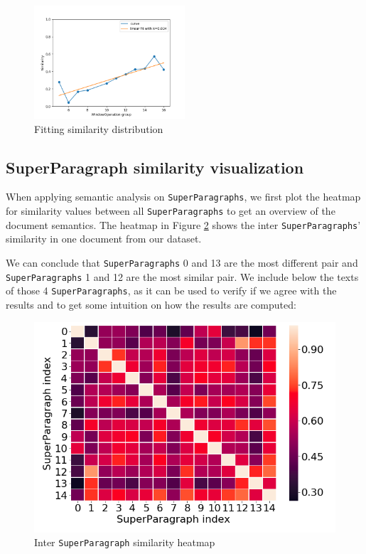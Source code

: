 \begin{figure}[htp]
    \centering
    \includegraphics[width=0.5\textwidth]{figures/linear_fiting.png}
    \caption{Fitting similarity distribution}
    \label{fitting}
\end{figure}



\subsection{SuperParagraph similarity visualization}
When applying semantic analysis on \texttt{SuperParagraphs}, we first plot the heatmap for similarity values between all \texttt{SuperParagraphs} to get an overview of the document semantics. The heatmap in Figure \ref{similarity_heatmap} shows the inter \texttt{SuperParagraphs}' similarity in one document from our dataset.

We can conclude that \texttt{SuperParagraphs} 0 and 13 are the most different pair and \texttt{SuperParagraphs} 1 and 12 are the most similar pair. We include below the texts of those 4 \texttt{SuperParagraphs}, as it can be used to verify if we agree with the results and to get some intuition on how the results are computed:

\begin{figure}[htp]
    \centering
    \includegraphics[width=0.49
    \textwidth]{figures/similarity_heatmap.png}
    \caption{Inter \texttt{SuperParagraph} similarity heatmap}
    \label{similarity_heatmap}
\end{figure}


